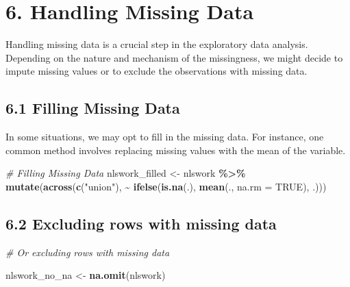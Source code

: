 \documentclass[
]{article}
\newenvironment{Shaded}{\begin{snugshade}}{\end{snugshade}}
\newcommand{\AttributeTok}[1]{\textcolor[rgb]{0.13,0.29,0.53}{#1}}
\newcommand{\CommentTok}[1]{\textcolor[rgb]{0.56,0.35,0.01}{\textit{#1}}}
\newcommand{\ConstantTok}[1]{\textcolor[rgb]{0.56,0.35,0.01}{#1}}
\newcommand{\FunctionTok}[1]{\textcolor[rgb]{0.13,0.29,0.53}{\textbf{#1}}}
\newcommand{\NormalTok}[1]{#1}
\newcommand{\OtherTok}[1]{\textcolor[rgb]{0.56,0.35,0.01}{#1}}
\newcommand{\SpecialCharTok}[1]{\textcolor[rgb]{0.81,0.36,0.00}{\textbf{#1}}}
\newcommand{\StringTok}[1]{\textcolor[rgb]{0.31,0.60,0.02}{#1}}
\begin{document}
\hypertarget{handling-missing-data}{%
\section{6. Handling Missing Data}\label{handling-missing-data}}

Handling missing data is a crucial step in the exploratory data
analysis. Depending on the nature and mechanism of the missingness, we
might decide to impute missing values or to exclude the observations
with missing data.

\hypertarget{filling-missing-data}{%
\subsection{6.1 Filling Missing Data}\label{filling-missing-data}}

In some situations, we may opt to fill in the missing data. For
instance, one common method involves replacing missing values with the
mean of the variable.

\begin{Shaded}
\begin{Highlighting}[]
\CommentTok{\# Filling Missing Data}
\NormalTok{nlswork\_filled }\OtherTok{\textless{}{-}}\NormalTok{ nlswork }\SpecialCharTok{\%\textgreater{}\%}
  \FunctionTok{mutate}\NormalTok{(}\FunctionTok{across}\NormalTok{(}\FunctionTok{c}\NormalTok{(}\StringTok{"union"}\NormalTok{), }\SpecialCharTok{\textasciitilde{}} \FunctionTok{ifelse}\NormalTok{(}\FunctionTok{is.na}\NormalTok{(.), }\FunctionTok{mean}\NormalTok{(., }\AttributeTok{na.rm =} \ConstantTok{TRUE}\NormalTok{), .))) }
\end{Highlighting}
\end{Shaded}

\hypertarget{excluding-rows-with-missing-data}{%
\subsection{6.2 Excluding rows with missing
data}\label{excluding-rows-with-missing-data}}

\begin{Shaded}
\begin{Highlighting}[]
\CommentTok{\# Or excluding rows with missing data}

\NormalTok{nlswork\_no\_na }\OtherTok{\textless{}{-}} \FunctionTok{na.omit}\NormalTok{(nlswork)}
\end{Highlighting}
\end{Shaded}
\end{document}

